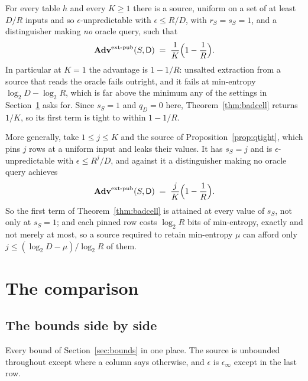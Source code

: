 \documentclass{aicr-solution}
\newcommand{\Adv}{\mathbf{Adv}}
\newcommand{\extpub}{\textup{ext-pub}}
\begin{document}
\begin{proposition}\label{prop:unsalted}
For every table $h$ and every $K \ge 1$ there is a source, uniform on a set of at least $D/R$
inputs and so $\epsilon$-unpredictable with $\epsilon \le R/D$, with $r_S = s_S = 1$, and a
distinguisher making \emph{no} oracle query, such that
\[
  \Adv^{\extpub}(S,\mathsf{D}) \;=\; \frac{1}{K}\Bigl(1 - \frac1R\Bigr) .
\]
In particular at $K = 1$ the advantage is $1 - 1/R$: unsalted extraction from a source that reads
the oracle fails outright, and it fails at min-entropy $\log_2 D - \log_2 R$, which is far above the
minimum any of the settings in Section~\ref{sec:compare} asks for. Since $s_S = 1$ and $q_D = 0$
here, Theorem~\ref{thm:badcell} returns $1/K$, so its first term is tight to within $1 - 1/R$.

More generally, take $1 \le j \le K$ and the source of Proposition~\ref{prop:qtight}, which pins $j$
rows at a uniform input and leaks their values. It has $s_S = j$ and is $\epsilon$-unpredictable
with $\epsilon \le R^{j}/D$, and against it a distinguisher making no oracle query achieves
\[
  \Adv^{\extpub}(S,\mathsf{D}) \;=\; \frac{j}{K}\Bigl(1 - \frac1R\Bigr) .
\]
So the first term of Theorem~\ref{thm:badcell} is attained at every value of $s_S$, not only at
$s_S = 1$; and each pinned row costs $\log_2 R$ bits of min-entropy, exactly and not merely at
most, so a source required to retain min-entropy $\mu$ can afford only
$j \le (\log_2 D - \mu)/\log_2 R$ of them.
\end{proposition}

\section{The comparison}\label{sec:compare}

\subsection*{The bounds side by side}

Every bound of Section~\ref{sec:bounds} in one place. The source is unbounded throughout except
where a column says otherwise, and $\epsilon$ is $\epsilon_\infty$ except in the last row.
\end{document}

